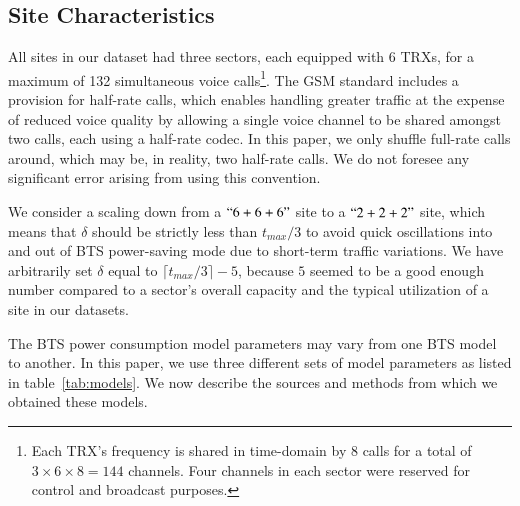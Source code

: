 
\subsection{Site Characteristics}
\label{subsec:sitetypes} All sites in our dataset had three sectors, each equipped with 6 TRXs, for a maximum of %
132 simultaneous voice calls\footnote[1]{Each TRX's frequency is shared in time-domain  by 8 calls for  a total of $3\times6\times8=144$ channels. Four channels in each sector were reserved for control and broadcast purposes.}. The GSM standard includes a provision for half-rate calls, which enables handling greater traffic at the expense of reduced voice quality by allowing a single voice channel to be shared amongst two calls, each using a half-rate codec. In this paper, we only shuffle full-rate calls around, which may be, in reality, two half-rate calls. We do not foresee any significant error arising from using this convention.

We consider a scaling down from a $``6+6+6"$ site to a $``2+2+2"$ site, which means that $\delta$ should be strictly less than $t_{max}/3$ to avoid quick oscillations into and out of BTS power-saving mode due to short-term traffic variations. %
We have arbitrarily set $\delta$ equal to $\lceil t_{max}/3\rceil -5$, because $5$ seemed to be a good enough number compared to a sector's overall capacity and the typical utilization of a site in our datasets.

The BTS power consumption model parameters may vary from one BTS model to another. In this paper, we use three different sets of model parameters as listed in table~\ref{tab:models}. We now describe the sources and methods from which we obtained these models.

